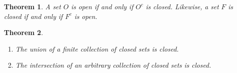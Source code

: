 \documentclass{amsart}
\newtheorem*{theorem}{Theorem}
\theoremstyle{definition}
\begin{document}
\begin{theorem}
  A set $O$ is open if and only if $O^c$ is closed. Likewise, a set $F$ is
  closed if and only if $F^c$ is open.
\end{theorem}

\begin{theorem}
  \begin{enumerate}[label={(\roman*)}]
    \item The union of a finite collection of closed sets is closed.
    \item The intersection of an arbitrary collection of closed sets is closed.
  \end{enumerate}
\end{theorem}
\end{document}
